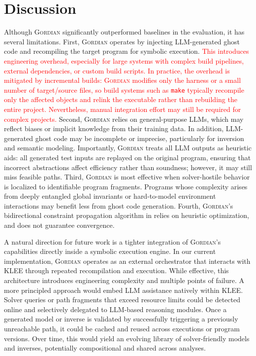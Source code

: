 \documentclass[acmsmall,screen,nonacm]{acmart}
\newcommand{\rev}[1]{\textcolor{red}{#1}}
\newcommand{\rev}[1]{#1}
\newcommand{\projName}{\textsc{Gordian}\xspace}
\theoremstyle{definition}
\begin{document}
\section{Discussion}

Although \projName significantly outperformed baselines in the evaluation, it has several limitations. First, \projName operates by injecting LLM-generated ghost code and recompiling the target program for symbolic execution. \rev{This introduces engineering overhead, especially for large systems with complex build pipelines, external dependencies, or custom build scripts. In practice, the overhead is mitigated by incremental builds: \projName{} modifies only the harness or a small number of target/source files, so build systems such as \texttt{make} typically recompile only the affected objects and relink the executable rather than rebuilding the entire project. Nevertheless, manual integration effort may still be required for complex projects.} Second, \projName relies on general-purpose LLMs, which may reflect biases or implicit knowledge from their training data. In addition, LLM-generated ghost code may be incomplete or imprecise, particularly for inversion and semantic modeling. Importantly, \projName{} treats all LLM outputs as heuristic aids: all generated test inputs are replayed on the original program, ensuring that incorrect abstractions affect efficiency rather than soundness; however, it may still miss feasible paths. Third, \projName is most effective when solver-hostile behavior is localized to identifiable program fragments. Programs whose complexity arises from deeply entangled global invariants or hard-to-model environment interactions may benefit less from ghost code generation. Fourth, \projName's bidirectional constraint propagation algorithm in  relies on heuristic optimization, and does not guarantee convergence.

A natural direction for future work is a tighter integration of \projName's capabilities directly inside a symbolic execution engine. In our current implementation, \projName{} operates as an external orchestrator that interacts with KLEE through repeated recompilation and execution. While effective, this architecture introduces engineering complexity and multiple points of failure. A more principled approach would embed LLM assistance natively within KLEE. Solver queries or path fragments that exceed resource limits could be detected online and selectively delegated to LLM-based reasoning modules. Once a generated model or inverse is validated by successfully triggering a previously unreachable path, it could be cached and reused across executions or program versions. Over time, this would yield an evolving library of solver-friendly models and inverses, potentially compositional and shared across analyses.
\end{document}
